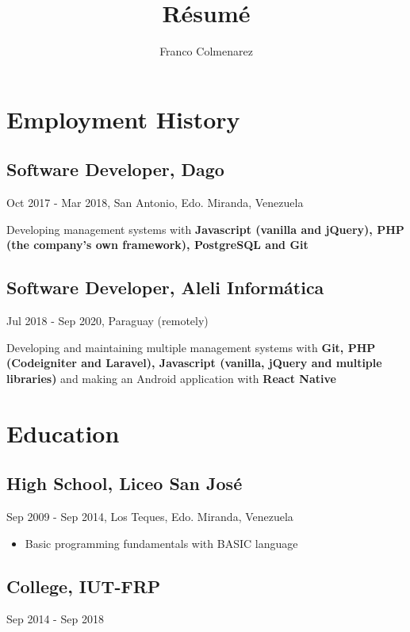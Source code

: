 \documentclass{article}
\author{Franco Colmenarez}
\title{R\'esum\'e}
\begin{document}
\maketitle

\section{Employment History}

\subsection{Software Developer, Dago}

Oct 2017 - Mar 2018, San Antonio, Edo. Miranda, Venezuela

Developing management systems with \textbf{Javascript (vanilla and jQuery), PHP (the company's own framework), PostgreSQL and Git}

\subsection{Software Developer, Aleli Inform\'atica}

Jul 2018 - Sep 2020, Paraguay (remotely)

Developing and maintaining multiple management systems with
\textbf{Git, PHP (Codeigniter and Laravel), Javascript (vanilla, jQuery and multiple libraries)}
and making an Android application with \textbf{React Native}

\section{Education}

\subsection{High School, Liceo San Jos\'e}

Sep 2009 - Sep 2014, Los Teques, Edo. Miranda, Venezuela

\begin{itemize}
    \item Basic programming fundamentals with BASIC language
\end{itemize}

\subsection{College, IUT-FRP}

Sep 2014 - Sep 2018
\end{document}
